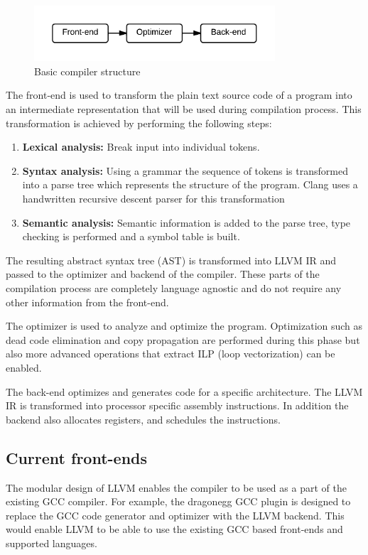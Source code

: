 
\begin{figure}[ht]
\centering
\includegraphics[width=0.8\textwidth]{2_background/img/Basic_compiler.png}
\caption{Basic compiler structure}
\label{fig:compiler_structure}
\end{figure}

The front-end is used to transform the plain text source code of a program into an intermediate representation that will be used during compilation process. This transformation is achieved by performing the following steps:

\begin{enumerate}
  \item \textbf{Lexical analysis:} Break input into individual tokens.
  \item \textbf{Syntax analysis:} Using a grammar the sequence of tokens is transformed into a parse tree which represents the structure of the program. Clang uses a handwritten recursive descent parser for this transformation
  \item \textbf{Semantic analysis:} Semantic information is added to the parse tree, type checking is performed and a symbol table is built.
\end{enumerate}

The resulting abstract syntax tree (AST) is transformed into LLVM IR and passed to the optimizer and backend of the compiler. These parts of the compilation process are completely language agnostic and do not require any other information from the front-end.

The optimizer is used to analyze and optimize the program. Optimization such as dead code elimination and copy propagation are performed during this phase but also more advanced operations that extract ILP (loop vectorization) can be enabled.

The back-end optimizes and generates code for a specific architecture. The LLVM IR is transformed into processor specific assembly instructions. In addition the backend also allocates registers, and schedules the instructions.

\subsection{Current front-ends}
The modular design of LLVM enables the compiler to be used as a part of the existing GCC compiler. For example, the dragonegg GCC plugin is designed to replace the GCC code generator and optimizer with the LLVM backend. This would enable LLVM to be able to use the existing GCC based front-ends and supported languages.

